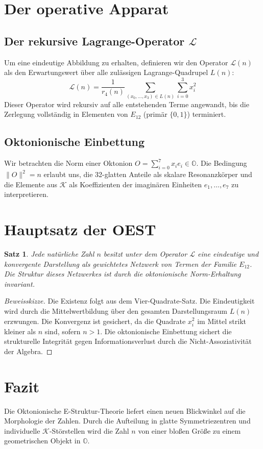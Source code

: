 \documentclass[12pt,a4paper]{article}
\newtheorem{theorem}{Satz}[section]
\begin{document}
	\section{Der operative Apparat}
	
	\subsection{Der rekursive Lagrange-Operator $\mathcal{L}$}
	Um eine eindeutige Abbildung zu erhalten, definieren wir den Operator $\mathcal{L}(n)$ als den Erwartungswert über alle zulässigen Lagrange-Quadrupel $L(n)$:
	\[ \mathcal{L}(n) = \frac{1}{r_4(n)} \sum_{(x_0, \dots, x_3) \in L(n)} \sum_{i=0}^3 x_i^2 \]
	Dieser Operator wird rekursiv auf alle entstehenden Terme angewandt, bis die Zerlegung vollständig in Elementen von $E_{12}$ (primär $\{0, 1\}$) terminiert.
	
	\subsection{Oktonionische Einbettung}
	Wir betrachten die Norm einer Oktonion $O = \sum_{i=0}^7 x_i e_i \in \mathbb{O}$. Die Bedingung $\|O\|^2 = n$ erlaubt uns, die 32-glatten Anteile als skalare Resonanzkörper und die Elemente aus $\mathcal{K}$ als Koeffizienten der imaginären Einheiten $e_1, \dots, e_7$ zu interpretieren.
	
	\section{Hauptsatz der OEST}
	\begin{theorem}
		Jede natürliche Zahl $n$ besitzt unter dem Operator $\mathcal{L}$ eine eindeutige und konvergente Darstellung als gewichtetes Netzwerk von Termen der Familie $E_{12}$. Die Struktur dieses Netzwerkes ist durch die oktonionische Norm-Erhaltung invariant.
	\end{theorem}
	
	\begin{proof}[Beweisskizze]
		Die Existenz folgt aus dem Vier-Quadrate-Satz. Die Eindeutigkeit wird durch die Mittelwertbildung über den gesamten Darstellungsraum $L(n)$ erzwungen. Die Konvergenz ist gesichert, da die Quadrate $x_i^2$ im Mittel strikt kleiner als $n$ sind, sofern $n > 1$. Die oktonionische Einbettung sichert die strukturelle Integrität gegen Informationsverlust durch die Nicht-Assoziativität der Algebra.
	\end{proof}
	
	\section{Fazit}
	Die Oktonionische E-Struktur-Theorie liefert einen neuen Blickwinkel auf die Morphologie der Zahlen. Durch die Aufteilung in glatte Symmetriezentren und individuelle $\mathcal{K}$-Störstellen wird die Zahl $n$ von einer bloßen Größe zu einem geometrischen Objekt in $\mathbb{O}$.
	
\end{document}
